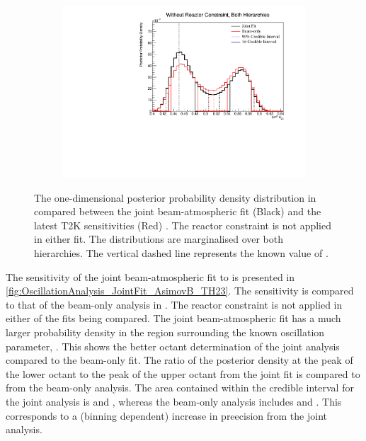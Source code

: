 \begin{figure}[h]
  \begin{subfigure}[t]{0.98\textwidth}
    \includegraphics[width=\textwidth, trim={0mm 0mm 0mm 0mm}, clip,page=1]{Figures/OA/JointFit_OA2020_Comp_AsimovB/ContourComparison_1D_th23_BH_2_woRC_UnSmeared_CredibleInterval.pdf}
  \end{subfigure}
  \caption{The one-dimensional posterior probability density distribution in  compared between the joint beam-atmospheric fit (Black) and the latest T2K sensitivities (Red) \cite{Dunne2020-uf, t2k_tn_393}. The reactor constraint is not applied in either fit. The distributions are marginalised over both hierarchies. The vertical dashed line represents the known value of .}
  \label{fig:OscillationAnalysis_JointFit_AsimovB_TH23}
\end{figure}

The sensitivity of the joint beam-atmospheric fit to  is presented in \autoref{fig:OscillationAnalysis_JointFit_AsimovB_TH23}. The sensitivity is compared to that of the beam-only analysis in \cite{Dunne2020-uf, t2k_tn_393}. The reactor constraint is not applied in either of the fits being compared. The joint beam-atmospheric fit has a much larger probability density in the region surrounding the known oscillation parameter, . This shows the better octant determination of the joint analysis compared to the beam-only fit. The ratio of the posterior density at the peak of the lower octant to the peak of the upper octant from the joint fit is  compared to  from the beam-only analysis. The area contained within the \quickmath{1\sigma} credible interval for the joint analysis is  and , whereas the beam-only analysis includes  and . This corresponds to a  (binning dependent) increase in preecision from the joint analysis.

